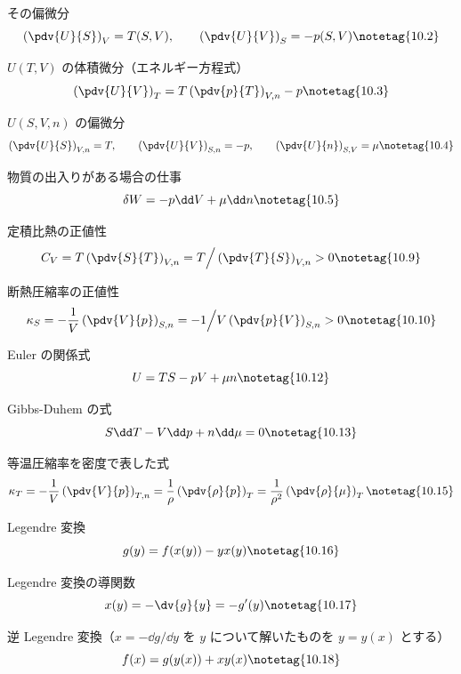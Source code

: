 \documentclass[uplatex,dvipdfmx,a4paper,11pt]{jsarticle}
\begin{document}
\begin{kirokuichiran}
\end{kirokuichiran}

\youtenseiri
\begin{noteshikilist}
  \item その偏微分 %
    \[ \left(\pdv{U}{S}\right)_{V} = T(S,V), \qquad \left(\pdv{U}{V}\right)_{S} = -p(S,V) \notetag{10.2} \]
  \item $U(T,V)$ の体積微分（エネルギー方程式） %
    \[ \left(\pdv{U}{V}\right)_{T} = T\left(\pdv{p}{T}\right)_{V,n} - p \notetag{10.3} \]
  \item $U(S,V,n)$ の偏微分 %
    \[ \left(\pdv{U}{S}\right)_{V,n} = T, \qquad \left(\pdv{U}{V}\right)_{S,n} = -p, \qquad \left(\pdv{U}{n}\right)_{S,V} = \mu \notetag{10.4} \]
  \item 物質の出入りがある場合の仕事 %
    \[ \delta W = -p\dd V + \mu\dd n \notetag{10.5} \]
  \item 定積比熱の正値性 %
    \[ C_{V} = T\left(\pdv{S}{T}\right)_{V,n} = T\Big/\left(\pdv{T}{S}\right)_{V,n} > 0 \notetag{10.9} \]
  \item 断熱圧縮率の正値性 %
    \[ \kappa_{S} = -\frac{1}{V}\left(\pdv{V}{p}\right)_{S,n} = -1\Big/V\left(\pdv{p}{V}\right)_{S,n} > 0 \notetag{10.10} \]
  \item Euler の関係式 %
    \[ U = TS - pV + \mu n \notetag{10.12} \]
  \item Gibbs-Duhem の式 %
    \[ S\dd T - V\dd p + n\dd\mu = 0 \notetag{10.13} \]
  \item 等温圧縮率を密度で表した式 %
    \[ \kappa_{T} = -\frac{1}{V}\left(\pdv{V}{p}\right)_{T,n} = \frac{1}{\rho}\left(\pdv{\rho}{p}\right)_{T} = \frac{1}{\rho^{2}}\left(\pdv{\rho}{\mu}\right)_{T} \notetag{10.15} \]
  \item Legendre 変換 %
    \[ g(y) = f(x(y)) - yx(y) \notetag{10.16} \]
  \item Legendre 変換の導関数 %
    \[ x(y) = -\dv{g}{y} = -g'(y) \notetag{10.17} \]
  \item 逆 Legendre 変換（$x = -\dd g/\dd y$ を $y$ について解いたものを $y = y(x)$ とする） %
    \[ f(x) = g(y(x)) + xy(x) \notetag{10.18} \]
\end{noteshikilist}
\end{document}
